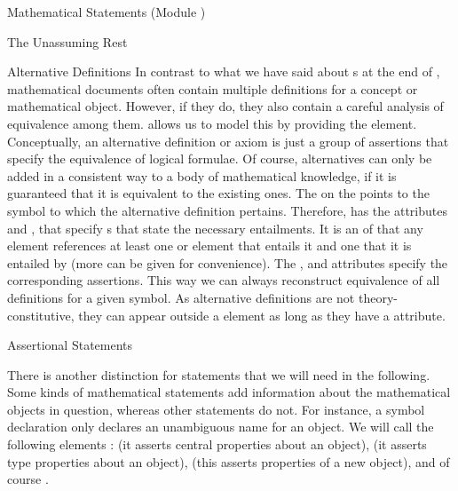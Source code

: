 \begin{tchapter}[id=statements,short=Mathematical Statements]{Mathematical Statements (Module {})}
\begin{tsection}[id=assertion]{The Unassuming Rest}
\begin{tsubsection}[id=alternative]{Alternative Definitions}
  In contrast to what we have said about {s} at the end
  of {}, mathematical documents often contain multiple
  definitions for a concept or mathematical object. However, if they do, they also contain
  a careful analysis of equivalence among them. {\omdoc} allows us to model this by
  providing the {} element.  Conceptually, an alternative definition or
  axiom is just a group of assertions that specify the equivalence of logical formulae. Of
  course, alternatives can only be added in a consistent way to a body of mathematical
  knowledge, if it is guaranteed that it is equivalent to the existing ones.  The
  {} on the {} points to the symbol to
  which the alternative definition pertains.  Therefore, {} has the
  attributes {} and
  {}, that specify {s} that state
  the necessary entailments. It is an {} of {\omdoc} that
  any {} element references at least one {} or
  {} element that entails it and one that it is entailed by (more can
  be given for convenience). The {}, and
  {} attributes specify the corresponding
  assertions. This way we can always reconstruct equivalence of all definitions for a
  given symbol. As alternative definitions are not theory-constitutive, they can appear
  outside a {} element as long as they have a
  {} attribute.
\end{tsubsection}

\begin{tsubsection}[id=assertional-statements,short=Assertional Statements]{Assertional Statements}
           
  There is another distinction for statements that we will need in the following. Some
  kinds of mathematical statements add information about the mathematical objects in
  question, whereas other statements do not. For instance, a symbol declaration only
  declares an unambiguous name for an object. We will call the following {\omdoc} elements
  {}: {} (it asserts
  central properties about an object), {} (it asserts type properties about
  an object), {} (this asserts properties of a new object), and of
  course {}.
  

\end{tsubsection}
\end{tsection}
\end{tchapter}

